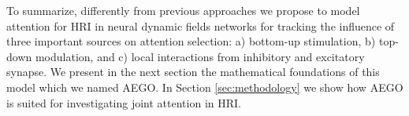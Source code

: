 \documentclass[letterpaper, 10 pt, conference]{ieeeconf}  %
\begin{document}
	To summarize, differently from previous approaches we propose to model attention for HRI in neural dynamic fields networks for tracking the influence of three important sources on attention selection: a) bottom-up stimulation, b) top-down modulation, and c) local interactions from inhibitory and excitatory synapse. We present in the next section the mathematical foundations of this model which we named AEGO. In Section \ref{sec:methodology} we show how AEGO is suited for investigating joint attention in HRI.
	
	
	
	
	
	
	
	
	
	
	
	
	
	 
	
\end{document}
